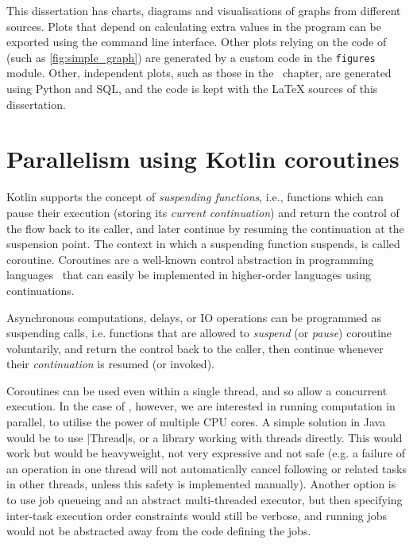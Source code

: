 This dissertation has charts, diagrams and visualisations of graphs from different sources.
Plots that depend on calculating extra values in the \graffs program can be exported using the command line interface.
Other plots relying on the code of \graffs (such as \cref{fig:simple_graph}) are generated by a custom code in the \texttt{figures} module.
Other, independent plots, such as those in the~ chapter, are generated using Python and SQL, and the code is kept with the LaTeX sources of this dissertation.


\section{Parallelism using Kotlin coroutines}\label{sec:kotlin_coroutines}

Kotlin supports the concept of \textsl{suspending functions}, i.e., functions which can pause their execution (storing its \textsl{current continuation}) and return the control of the flow back to its caller, and later continue by resuming the continuation at the suspension point.
The context in which a suspending function suspends, is called coroutine.
Coroutines are a well-known control abstraction in programming languages~\cite{MouraRevisitingCoroutines2009} that can easily be implemented in higher-order languages using continuations\cite{HaynesContinuationsCoroutines1984}.

Asynchronous computations, delays, or IO operations can be programmed as suspending calls, i.e. functions that are allowed to \textsl{suspend} (or \textsl{pause}) coroutine voluntarily, and return the control back to the caller, then continue whenever their \textsl{continuation} is resumed (or invoked).

Coroutines can be used even within a single thread, and so allow a concurrent execution.
In the case of \graffs, however, we are interested in running computation in parallel, to utilise the power of multiple CPU cores.
A simple solution in Java would be to use |Thread|s, or a library working with threads directly.
This would work but would be heavyweight, not very expressive and not safe (e.g. a failure of an operation in one thread will not automatically cancel following or related tasks in other threads, unless this safety is implemented manually).
Another option is to use job queueing and an abstract multi-threaded executor, but then specifying inter-task execution order constraints would still be verbose, and running jobs would not be abstracted away from the code defining the jobs.

